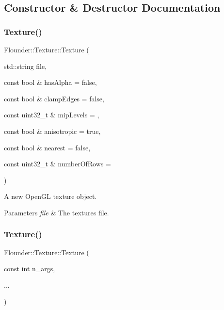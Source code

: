 \subsection{Constructor \& Destructor Documentation}
\mbox{\label{class_flounder_1_1_texture_ac60bc0a669aaa5fefc000c79e689faa9}} 
\subsubsection{\texorpdfstring{Texture()}{Texture()}\hspace{0.1cm}{\footnotesize\ttfamily [1/2]}}
{\footnotesize\ttfamily Flounder\+::\+Texture\+::\+Texture (\begin{DoxyParamCaption}\item[{std\+::string}]{file,  }\item[{const bool \&}]{has\+Alpha = {\ttfamily false},  }\item[{const bool \&}]{clamp\+Edges = {\ttfamily false},  }\item[{const uint32\+\_\+t \&}]{mip\+Levels = {},  }\item[{const bool \&}]{anisotropic = {\ttfamily true},  }\item[{const bool \&}]{nearest = {\ttfamily false},  }\item[{const uint32\+\_\+t \&}]{number\+Of\+Rows = {} }\end{DoxyParamCaption})}



A new Open\+GL texture object. 


\begin{DoxyParams}{Parameters}
{\em file} & The textures file. \\
\hline
\end{DoxyParams}
\mbox{\label{class_flounder_1_1_texture_a5ae861da9c85957c8ec9732b049d47c4}} 
\subsubsection{\texorpdfstring{Texture()}{Texture()}\hspace{0.1cm}{\footnotesize\ttfamily [2/2]}}
{\footnotesize\ttfamily Flounder\+::\+Texture\+::\+Texture (\begin{DoxyParamCaption}\item[{const int}]{n\+\_\+args,  }\item[{}]{... }\end{DoxyParamCaption})}



